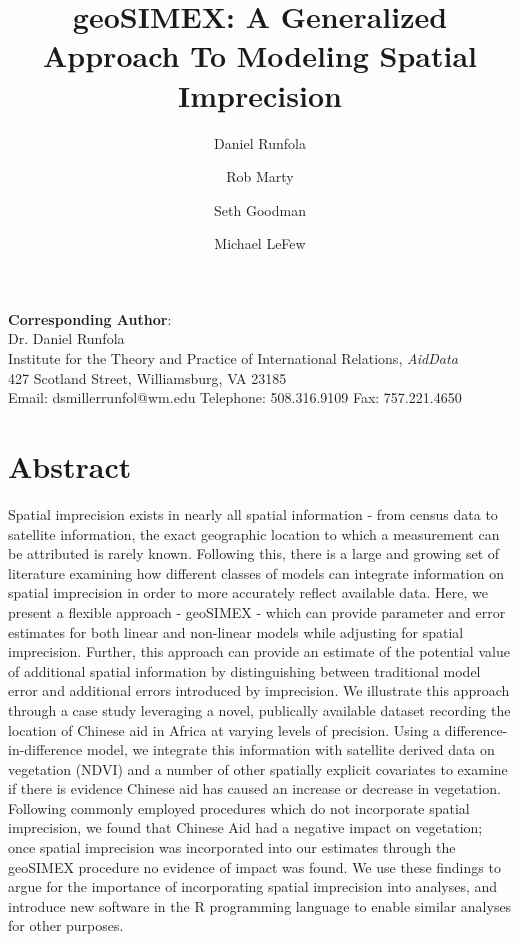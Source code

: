 \documentclass[11pt]{article}
\author[1]{Daniel Runfola}
\author[1]{Rob Marty}
\author[1]{Seth Goodman}
\author[1]{Michael LeFew}
\affil[1]{Institute for the Theory and Practice of International Relations, AidData, The College of William and Mary}
\title{geoSIMEX: A Generalized Approach To Modeling Spatial Imprecision}
\begin{document}



\maketitle 
\begin{flushleft}
\textbf{Corresponding Author}:\\
Dr. Daniel Runfola\\
Institute for the Theory and Practice of International Relations, \emph{AidData}\\
427 Scotland Street, Williamsburg, VA 23185\\
Email: dsmillerrunfol@wm.edu
Telephone: 508.316.9109
Fax: 757.221.4650
\end{flushleft}


\newpage

\doublespacing

\section{Abstract}
Spatial imprecision exists in nearly all spatial information - from census data to satellite information, the exact geographic location to which a measurement can be attributed is rarely known.
Following this, there is a large and growing set of literature examining how different classes of models can integrate information on spatial imprecision in order to more accurately reflect available data.
Here, we present a flexible approach - geoSIMEX - which can provide parameter and error estimates for both linear and non-linear models while adjusting for spatial imprecision.
Further, this approach can provide an estimate of the potential value of additional spatial information by distinguishing between traditional model error and additional errors introduced by imprecision.
We illustrate this approach through a case study leveraging a novel, publically available dataset recording the location of Chinese aid in Africa at varying levels of precision.
Using a difference-in-difference model, we integrate this information with satellite derived data on vegetation (NDVI) and a number of other spatially explicit covariates to examine if there is evidence Chinese aid has caused an increase or decrease in vegetation.
Following commonly employed procedures which do not incorporate spatial imprecision, we found that Chinese Aid had a negative impact on vegetation; once spatial imprecision was incorporated into our estimates through the geoSIMEX procedure no evidence of impact was found.
We use these findings to argue for the importance of incorporating spatial imprecision into analyses, and introduce new software in the R programming language to enable similar analyses for other purposes.
\end{document}
